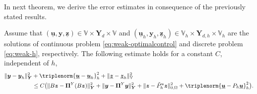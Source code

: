 \documentclass[smallextended]{svjour3}
\numberwithin{equation}{section}
\numberwithin{figure}{section}
\numberwithin{table}{section}
\newcommand\bPi{\boldsymbol{\Pi}}
\newcommand{\tP}{\tilde{P}}
\newcommand\buu{\underline{\boldsymbol{u}}}
\newcommand\buz{\underline{\boldsymbol{z}}}
\newcommand\by{\boldsymbol{y}}
\newcommand\bz{\boldsymbol{z}}
\newcommand{\bYd}{\boldsymbol{Y}_d}
\newcommand{\bY}{\boldsymbol{Y}}
\newcommand{\bbV}{\mathbb{V}}
\begin{document}
\noindent In next theorem, we derive the error estimates in consequence of the previously stated results.
\begin{theorem} \label{thm:abs-control}
	Assume that $(\buu,\by,\buz) \in \bbV \times \bYd \times \bbV$ and $(\buu_h, \by_h, \buz_h) \in \bbV_h \times \bY_{d,h} \times \bbV_h$ are the solutions of continuous problem \eqref{eq:weak-optimalcontrol} and discrete problem \eqref{eq:weak-h}, respectively. The following estimate holds for a constant $C$, independent of $h$,
	\begin{align*}
		\| \by - \by_h \|_{\bY}^2 & + \triplenorm{ \buu - \buu_h}_h^2 + \| \buz - \buz_h \|_{\bbV}^2\\
		 & \le C \big( \| B \bz - \bPi^Y (B \bz) \|_{\bY}^2 + \| \by - \bPi^Y \by \|_{\bY}^2  + \| \bz - \tP_h^u \bz\|_{0, \Omega}^2 + \triplenorm{ \buu - P_h \buu }_h^2 \big).
	\end{align*}
\end{theorem}
\end{document}
